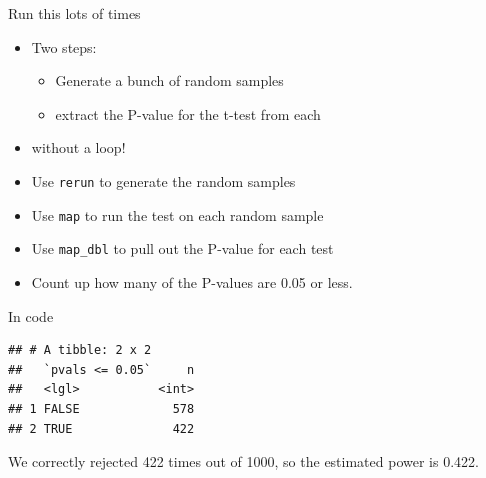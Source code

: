 \documentclass[ignorenonframetext,]{beamer}
\newenvironment{Shaded}{\begin{snugshade}}{\end{snugshade}}
\newcommand{\DataTypeTok}[1]{\textcolor[rgb]{0.13,0.29,0.53}{#1}}
\newcommand{\DecValTok}[1]{\textcolor[rgb]{0.00,0.00,0.81}{#1}}
\newcommand{\FloatTok}[1]{\textcolor[rgb]{0.00,0.00,0.81}{#1}}
\newcommand{\KeywordTok}[1]{\textcolor[rgb]{0.13,0.29,0.53}{\textbf{#1}}}
\newcommand{\NormalTok}[1]{#1}
\newcommand{\OperatorTok}[1]{\textcolor[rgb]{0.81,0.36,0.00}{\textbf{#1}}}
\newcommand{\StringTok}[1]{\textcolor[rgb]{0.31,0.60,0.02}{#1}}
\providecommand{\tightlist}{%
  \setlength{\itemsep}{0pt}\setlength{\parskip}{0pt}}
\begin{document}
\begin{frame}[fragile]{Run this lots of times}
\protect\hypertarget{run-this-lots-of-times}{}

\begin{itemize}
\tightlist
\item
  Two steps:

  \begin{itemize}
  \tightlist
  \item
    Generate a bunch of random samples
  \item
    extract the P-value for the t-test from each
  \end{itemize}
\item
  without a loop!
\item
  Use \texttt{rerun} to generate the random samples
\item
  Use \texttt{map} to run the test on each random sample
\item
  Use \texttt{map\_dbl} to pull out the P-value for each test
\item
  Count up how many of the P-values are 0.05 or less.
\end{itemize}

\end{frame}

\begin{frame}[fragile]{In code}
\protect\hypertarget{in-code}{}

\begin{Shaded}
\end{Shaded}

\begin{verbatim}
## # A tibble: 2 x 2
##   `pvals <= 0.05`     n
##   <lgl>           <int>
## 1 FALSE             578
## 2 TRUE              422
\end{verbatim}

We correctly rejected 422 times out of 1000, so the estimated power is
0.422.

\end{frame}
\end{document}
